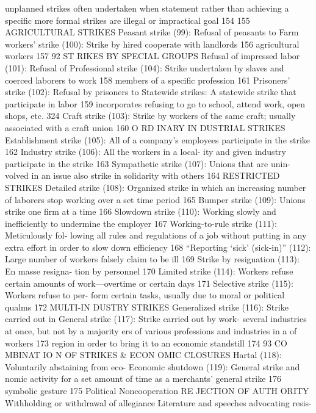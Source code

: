 \documentclass[twoside,a4paper,12pt,fleqn,openany]{extbook}
\begin{document}
 unplanned strikes often undertaken when
statement rather than achieving a specific
 more formal strikes are illegal or impractical		
goal
 154
 155
AGRICULTURAL STRIKES
Peasant strike (99): Refusal of peasants to
 Farm workers’ strike (100): Strike by hired
cooperate with landlords
 156
 agricultural workers
 157
92
ST RIKES BY SPECIAL GROUPS
Refusal of impressed labor (101): Refusal of
 Professional strike (104): Strike undertaken by
slaves and coerced laborers to work
 158
 members of a specific profession
 161
Prisoners’ strike (102): Refusal by prisoners to
 Statewide strikes: A statewide strike that
participate in labor
 159
 incorporates refusing to go to school, attend
work, open shops, etc.
 324
Craft strike (103): Strike by workers of the
same craft; usually associated with a craft
union
 160
O RD INARY IN DUSTRIAL STRIKES
Establishment strike (105): All of a company’s
employees participate in the strike
 162
Industry strike (106): All the workers in a local-
ity and given industry participate in the strike		
163
Sympathetic strike (107): Unions that are unin-
volved in an issue also strike in solidarity with
others
 164
RESTRICTED STRIKES
Detailed strike (108): Organized strike in which
an increasing number of laborers stop working
over a set time period
 165
Bumper strike (109): Unions strike one firm at
a time
 166
Slowdown strike (110): Working slowly and
inefficiently to undermine the employer 167
Working-to-rule strike (111): Meticulously fol-
lowing all rules and regulations of a job without
putting in any extra effort in order to slow down
efficiency
 168
“Reporting ‘sick’ (sick-in)” (112): Large number
of workers falsely claim to be ill
 169
Strike by resignation (113): En masse resigna-
tion by personnel
 170
Limited strike (114): Workers refuse certain
amounts of work—overtime or certain days 171
Selective strike (115): Workers refuse to per-
form certain tasks, usually due to moral or
political qualms
 172
MULTI-IN DUSTRY STRIKES
Generalized strike (116): Strike carried out in
 General strike (117): Strike carried out by work-
several industries at once, but not by a majority
 ers of various professions and industries in a
of workers
 173
 region in order to bring it to an economic
standstill
 174
93
CO MBINAT IO N OF STRIKES & ECON OMIC CLOSURES
Hartal (118): Voluntarily abstaining from eco-
 Economic shutdown (119): General strike and
nomic activity for a set amount of time as a
 merchants’ general strike
 176
symbolic gesture
 175
Political Noncooperation
RE JECTION OF AUTH ORITY
Withholding or withdrawal of allegiance
 Literature and speeches advocating resis-
\end{document}
